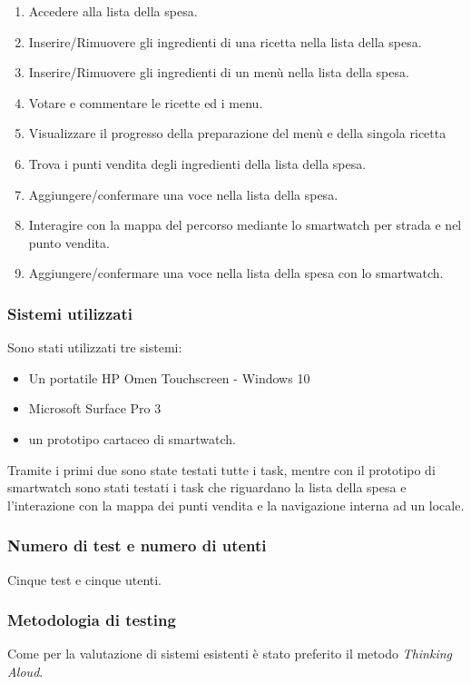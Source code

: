 \begin{enumerate}
\item Accedere alla lista della spesa.
\item Inserire/Rimuovere gli ingredienti di una ricetta nella lista della spesa.
\item Inserire/Rimuovere gli ingredienti di un menù nella lista della spesa.

\item Votare e commentare le ricette ed i menu.

\item Visualizzare il progresso della preparazione del menù e della singola ricetta

\item Trova i punti vendita degli ingredienti della lista della spesa.
\item Aggiungere/confermare una voce nella lista della spesa.
\item Interagire con la mappa del percorso mediante lo smartwatch per strada e nel punto vendita.
\item Aggiungere/confermare una voce nella lista della spesa con lo smartwatch.
\end{enumerate}

\subsubsection*{Sistemi utilizzati}
Sono stati utilizzati tre sistemi:
\begin{itemize}
\item Un portatile HP Omen Touchscreen - Windows 10
\item Microsoft Surface Pro 3
\item un prototipo cartaceo di smartwatch.
\end{itemize}
Tramite i primi due sono state testati tutte i task, mentre con il
prototipo di smartwatch sono stati testati i task che riguardano la
lista della spesa e l'interazione con la mappa dei punti vendita e la
navigazione interna ad un locale.
\subsubsection*{Numero di test e numero di utenti}
Cinque test e cinque utenti.
\subsubsection*{Metodologia di testing}
Come per la valutazione di sistemi esistenti è stato preferito il metodo
\emph{Thinking Aloud}.
